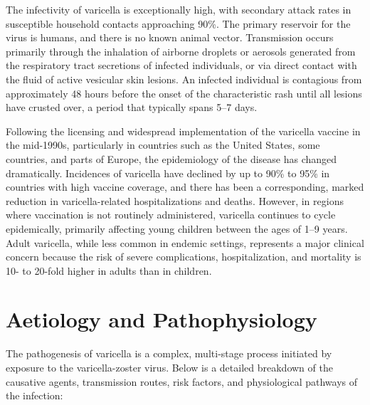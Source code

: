 The infectivity of varicella is exceptionally high, with secondary attack rates in susceptible household contacts approaching 90\%. The primary reservoir for the virus is humans, and there is no known animal vector. Transmission occurs primarily through the inhalation of airborne droplets or aerosols generated from the respiratory tract secretions of infected individuals, or via direct contact with the fluid of active vesicular skin lesions. An infected individual is contagious from approximately 48 hours before the onset of the characteristic rash until all lesions have crusted over, a period that typically spans 5--7 days.

Following the licensing and widespread implementation of the varicella vaccine in the mid-1990s, particularly in countries such as the United States, some countries, and parts of Europe, the epidemiology of the disease has changed dramatically. Incidences of varicella have declined by up to 90\% to 95\% in countries with high vaccine coverage, and there has been a corresponding, marked reduction in varicella-related hospitalizations and deaths. However, in regions where vaccination is not routinely administered, varicella continues to cycle epidemically, primarily affecting young children between the ages of 1--9 years. Adult varicella, while less common in endemic settings, represents a major clinical concern because the risk of severe complications, hospitalization, and mortality is 10- to 20-fold higher in adults than in children.

\section*{Aetiology and Pathophysiology}
The pathogenesis of varicella is a complex, multi-stage process initiated by exposure to the varicella-zoster virus. Below is a detailed breakdown of the causative agents, transmission routes, risk factors, and physiological pathways of the infection:

